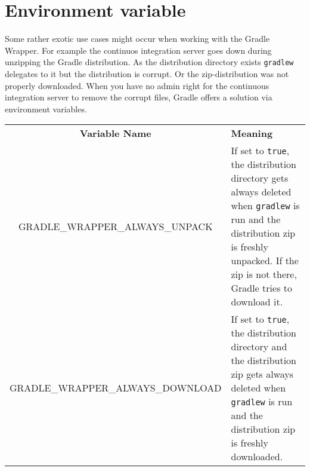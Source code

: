 
\section{Environment variable} %
\label{sec:environment_variable}
Some rather exotic use cases might occur when working with the Gradle Wrapper. For example the continuos integration server goes down during unzipping the Gradle distribution. As the distribution directory exists \texttt{gradlew} delegates to it but the distribution is corrupt. Or the zip-distribution was not properly downloaded. When you have no admin right for the continuous integration server to remove the corrupt files, Gradle offers a solution via environment variables.

\begin{tabularx}{\textwidth}{cX} 
	\textbf{Variable Name} & \centerline{\textbf{Meaning}}\\
    GRADLE\_WRAPPER\_ALWAYS\_UNPACK & If set to \texttt{true}, the distribution directory gets always deleted when \texttt{gradlew} is run and the distribution zip is freshly unpacked. If the zip is not there, Gradle tries to download it. \\
	GRADLE\_WRAPPER\_ALWAYS\_DOWNLOAD & If set to \texttt{true}, the distribution directory and the distribution zip gets always deleted when \texttt{gradlew} is run and the distribution zip is freshly downloaded. \\
\end{tabularx}
